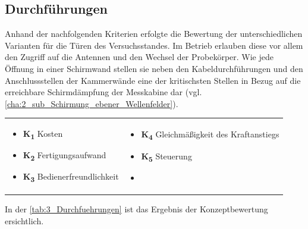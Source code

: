 \subsection{Durchführungen}\label{cha:3_sub_Durchfuehrungen}

Anhand der nachfolgenden Kriterien erfolgte die Bewertung der unterschiedlichen Varianten für die Türen des Versuchsstandes. Im Betrieb erlauben diese vor allem den Zugriff auf die Antennen und den Wechsel der Probekörper. Wie jede Öffnung in einer Schirmwand stellen sie neben den Kabeldurchführungen und den Anschlussstellen der Kammerwände eine der kritischsten Stellen in Bezug auf die erreichbare Schirmdämpfung der Messkabine dar (vgl. \Abschnitt\ref{cha:2_sub_Schirmung_ebener_Wellenfelder}). 

\begin{tabular}{l l}
    \hspace*{1cm} \parbox[c][3cm]{7cm}{
        \begin{itemize}[]
            \item \textbf{K\textsubscript{1}} Kosten
            \item \textbf{K\textsubscript{2}} Fertigungsaufwand
            \item \textbf{K\textsubscript{3}} Bedienerfreundlichkeit
        \end{itemize}
    }&
    \parbox[c]{7cm}{
        \begin{itemize}[]
            \item \textbf{K\textsubscript{4}} Gleichmäßigkeit des Kraftanstiegs
            \item \textbf{K\textsubscript{5}} Steuerung
            \item
        \end{itemize}
    }
\end{tabular}

In der \Tabelle\ref{tab:3_Durchfuehrungen} ist das Ergebnis der Konzeptbewertung ersichtlich.

